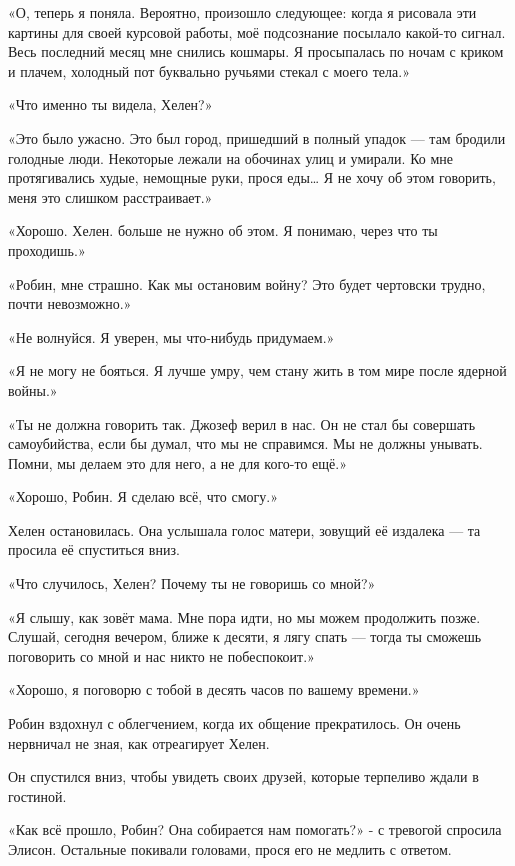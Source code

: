 \documentclass[a4paper,12pt]{book}
\begin{document}
\par
«О, теперь я поняла. Вероятно, произошло следующее: когда я рисовала эти картины для своей курсовой работы, моё подсознание посылало какой-то сигнал. Весь последний месяц мне снились кошмары. Я просыпалась по ночам с криком и плачем, холодный пот буквально ручьями стекал с моего тела.»
\par
«Что именно ты видела, Хелен?»
\par
«Это было ужасно. Это был город, пришедший в полный упадок — там бродили голодные люди. Некоторые лежали на обочинах улиц и умирали. Ко мне протягивались худые, немощные руки, прося еды… Я не хочу об этом говорить, меня это слишком расстраивает.»
\par
«Хорошо. Хелен. больше не нужно об этом. Я понимаю, через что ты проходишь.»
\par
«Робин, мне страшно. Как мы остановим войну? Это будет чертовски трудно, почти невозможно.»
\par
«Не волнуйся. Я уверен, мы что-нибудь придумаем.»
\par
«Я не могу не бояться. Я лучше умру, чем стану жить в том мире после ядерной войны.»
\par
«Ты не должна говорить так. Джозеф верил в нас. Он не стал бы совершать самоубийства, если бы думал, что мы не справимся. Мы не должны унывать. Помни, мы делаем это для него, а не для кого-то ещё.»
\par
«Хорошо, Робин. Я сделаю всё, что смогу.»
\par
Хелен остановилась. Она услышала голос матери, зовущий её издалека — та просила её спуститься вниз.
\par
«Что случилось, Хелен? Почему ты не говоришь со мной?»
\par
«Я слышу, как зовёт мама. Мне пора идти, но мы можем продолжить позже. Слушай, сегодня вечером, ближе к десяти, я лягу спать — тогда ты сможешь поговорить со мной и нас никто не побеспокоит.»
\par
«Хорошо, я поговорю с тобой в десять часов по вашему времени.»\\
\par
Робин вздохнул с облегчением, когда их общение прекратилось. Он очень нервничал не зная, как отреагирует Хелен.
\par
Он спустился вниз, чтобы увидеть своих друзей, которые терпеливо ждали в гостиной.
\par
«Как всё прошло, Робин? Она собирается нам помогать?» - с тревогой спросила Элисон. Остальные покивали головами, прося его не медлить с ответом.
\end{document}
